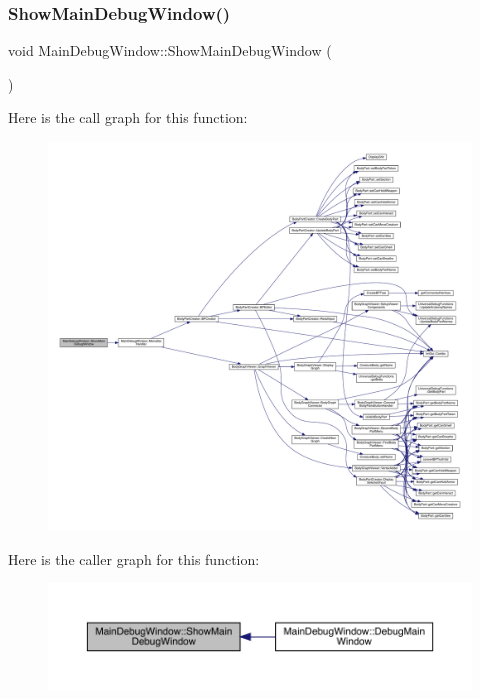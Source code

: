 \subsubsection{\texorpdfstring{Show\+Main\+Debug\+Window()}{ShowMainDebugWindow()}}
{\footnotesize\ttfamily void Main\+Debug\+Window\+::\+Show\+Main\+Debug\+Window (\begin{DoxyParamCaption}{ }\end{DoxyParamCaption})}

Here is the call graph for this function\+:
\nopagebreak
\begin{figure}[H]
\begin{center}
\leavevmode
\includegraphics[width=350pt]{d9/dd7/namespace_main_debug_window_ae0112f4e295169b45c2615b4915e3cc5_cgraph}
\end{center}
\end{figure}
Here is the caller graph for this function\+:
\nopagebreak
\begin{figure}[H]
\begin{center}
\leavevmode
\includegraphics[width=350pt]{d9/dd7/namespace_main_debug_window_ae0112f4e295169b45c2615b4915e3cc5_icgraph}
\end{center}
\end{figure}


